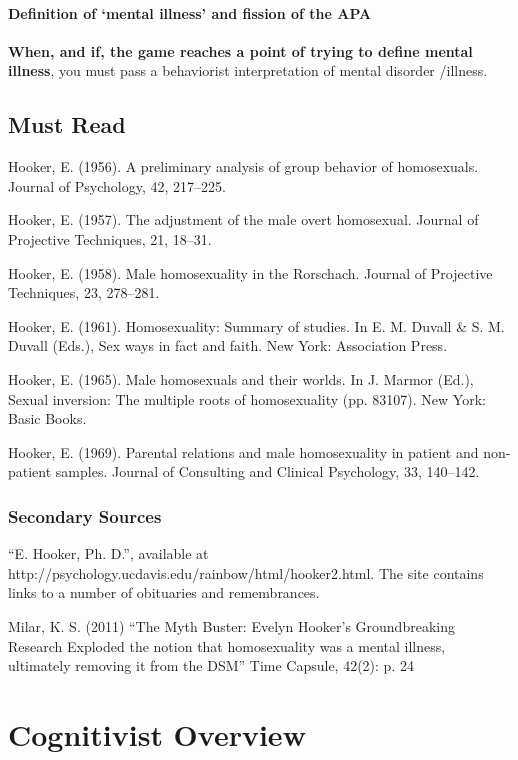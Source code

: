 \begin{refsection}
\subsubsection{Definition of ‘mental illness’ and fission of the APA}
\label{definitionof‘mentalillness’andfissionoftheapa}

\textbf{When, and if, the game reaches a point of trying to define mental illness}, you must pass a behaviorist interpretation of mental disorder \slash  illness.

\section{Must Read}
\label{mustread}

Hooker, E. (1956). A preliminary analysis of group behavior of homosexuals. Journal of Psychology, 42, 217--225.

Hooker, E. (1957). The adjustment of the male overt homosexual. Journal of Projective Techniques, 21, 18--31.

Hooker, E. (1958). Male homosexuality in the Rorschach. Journal of Projective Techniques, 23, 278--281.

Hooker, E. (1961). Homosexuality: Summary of studies. In E. M. Duvall \& S. M. Duvall (Eds.), Sex ways in fact and faith. New York: Association Press.

Hooker, E. (1965). Male homosexuals and their worlds. In J. Marmor (Ed.), Sexual inversion: The multiple roots of homosexuality (pp. 83107). New York: Basic Books.

Hooker, E. (1969). Parental relations and male homosexuality in patient and non-patient samples. Journal of Consulting and Clinical Psychology, 33, 140--142.

\subsection{Secondary Sources}
\label{secondarysources}

“E. Hooker, Ph. D.”, available at http:\slash \slash psychology.ucdavis.edu\slash rainbow\slash html\slash hooker2.html. The site contains links to a number of obituaries and remembrances.

Milar, K. S. (2011) “The Myth Buster: Evelyn Hooker's Groundbreaking Research Exploded the notion that homosexuality was a mental illness, ultimately removing it from the DSM” Time Capsule, 42(2): p. 24

\pagebreak 

\chapter{Cognitivist Overview}
\label{cognitivistoverview}


\end{refsection}

